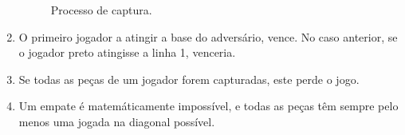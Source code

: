 \documentclass[15pt,a4paper]{article}
\begin{document}
\begin{enumerate}
\begin{figure}[H]
\begin{center}
\hspace{10px}
\caption{Processo de captura.}
\label{fig:2}
\end{center}
\end{figure}

\item O primeiro jogador a atingir a base do adversário, vence. No caso anterior, se o jogador preto atingisse a linha 1, venceria.
\item Se todas as peças de um jogador forem capturadas, este perde o jogo.
\item Um empate é matemáticamente impossível, e todas as peças têm sempre pelo menos uma jogada na diagonal possível.

\end{enumerate}


\end{document}
